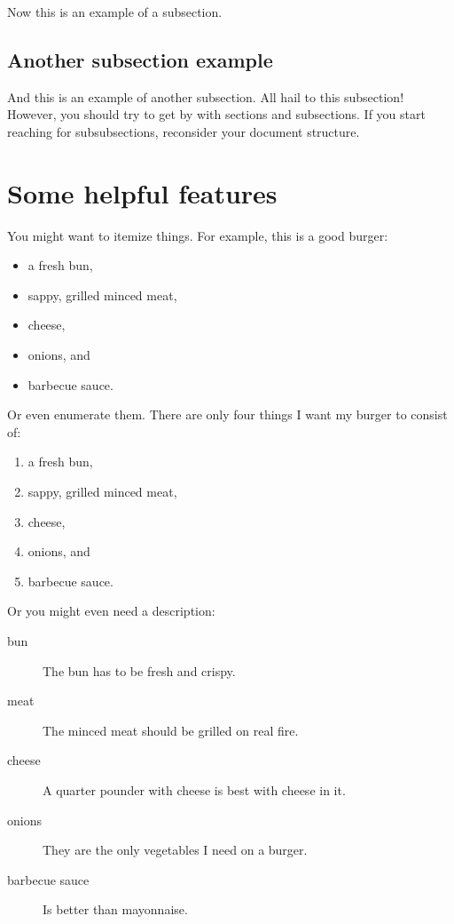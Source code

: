\documentclass{acm_proc_article-sp}
\begin{document}
Now this is an example of a subsection.


\subsection{Another subsection example}
\label{subsec:compoundSubsection}

And this is an example of another subsection.
All hail to this subsection!
However,
you should try to get by
with sections and subsections.
If you start reaching for subsubsections,
reconsider your document structure.


\section{Some helpful features}

You might want to itemize things.
For example,
this is a good burger:
\begin{itemize}
  \item a fresh bun,
  \item sappy, grilled minced meat,
  \item cheese,
  \item onions, and
  \item barbecue sauce.
\end{itemize}

Or even enumerate them.
There are only four things
I want my burger to consist of:
\begin{enumerate}
  \item a fresh bun,
  \item sappy, grilled minced meat,
  \item cheese,
  \item onions, and
  \item barbecue sauce.
\end{enumerate}

Or you might even need a description:
\begin{description}
  \item [bun] The bun has to be fresh and crispy.
  \item [meat] The minced meat should be grilled on real fire.
  \item [cheese] A quarter pounder with cheese is best with cheese in it.
  \item [onions] They are the only vegetables I need on a burger.
  \item [barbecue sauce] Is better than mayonnaise.
\end{description}
\end{document}
